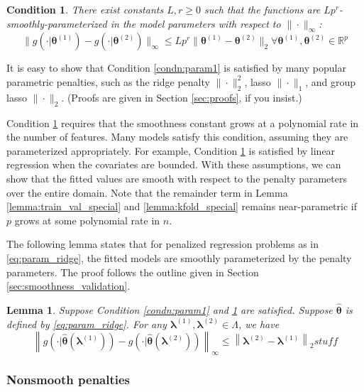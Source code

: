 \documentclass[12pt]{article}
\newtheorem{lemma}{Lemma}
\newtheorem{condition}{Condition}
\begin{document}
\begin{condition}
\label{condn:param2}
There exist constants $L, r \ge 0$ such that the functions are $Lp^r$-smoothly-parameterized in the model parameters with respect to $\| \cdot \|_\infty$:
\begin{equation}
\|g(\cdot|\boldsymbol{\theta}^{(1)})-g(\cdot|\boldsymbol{\theta}^{(2)})\|_{\infty}\le Lp^{r}\|\boldsymbol{\theta}^{(1)}-\boldsymbol{\theta}^{(2)}\|_{2} \forall \boldsymbol{\theta}^{(1)}, \boldsymbol{\theta}^{(2)} \in \mathbb{R}^p
\end{equation}
\end{condition}

It is easy to show that Condition \ref{condn:param1} is satisfied by many popular parametric penalties, such as the ridge penalty $\| \cdot \|_2^2$, lasso $\| \cdot \|_1$, and group lasso $\| \cdot \|_2$. (Proofs are given in Section \ref{sec:proofs}, if you insist.) 

Condition \ref{condn:param2} requires that the smoothness constant grows at a polynomial rate in the number of features. Many models satisfy this condition, assuming they are parameterized appropriately. For example, Condition \ref{condn:param2} is satisfied by linear regression when the covariates are bounded. With these assumptions, we can show that the fitted values are smooth with respect to the penalty parameters over the entire domain. Note that the remainder term in Lemma \ref{lemma:train_val_special} and \ref{lemma:kfold_special} remains near-parametric if $p$ grows at some polynomial rate in $n$.

The following lemma states that for penalized regression problems as in \eqref{eq:param_ridge}, the fitted models are smoothly parameterized by the penalty parameters. The proof follows the outline given in Section \ref{sec:smoothness_validation}. 
\begin{lemma}
\label{lemma:parametric}
Suppose Condition \ref{condn:param1} and \ref{condn:param2} are satisfied.
Suppose $\hat{\boldsymbol{\theta}}$ is defined by \eqref{eq:param_ridge}.
For any $\boldsymbol{\lambda}^{(1)}, \boldsymbol{\lambda}^{(2)} \in \Lambda$, we have
\[
\left \|
g \left (\cdot|\hat{\boldsymbol{\theta}}(\boldsymbol{\lambda}^{(1)}) \right ) - g \left ( \cdot|\hat{\boldsymbol{\theta}}(\boldsymbol{\lambda}^{(2)}) \right )
\right \|_{\infty}
\le
\left \|
\boldsymbol{\lambda}^{(2)}-\boldsymbol{\lambda}^{(1)} 
\right \|_{2}
stuff
\]
\end{lemma}

\subsubsection{Nonsmooth penalties}\label{sec:nonsmooth}
\end{document}
